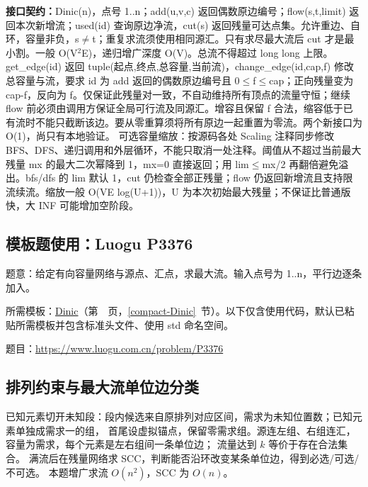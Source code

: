 {\sloppy{}\noindent\textbf{接口契约：}Dinic(n)，点号 1..n；add(u,v,c) 返回偶数原边编号；flow(s,t,limit) 返回本次新增流；used(id) 查询原边净流，cut(s) 返回残量可达点集。允许重边、自环，容量非负，s$\ne$t；重复求流须使用相同源汇。只有求尽最大流后 cut 才是最小割。一般 O(V$^{2}$E)，递归增广深度 O(V)。总流不得超过 long long 上限。 get\_edge(id) 返回 tuple(起点,终点,总容量,当前流)，change\_edge(id,cap,f) 修改总容量与流，要求 id 为 add 返回的偶数原边编号且 0$\le$f$\le$cap；正向残量变为 cap-f，反向为 f。仅保证此残量对一致，不自动维持所有顶点的流量守恒；继续 flow 前必须由调用方保证全局可行流及同源汇。增容且保留 f 合法，缩容低于已有流时不能只截断该边。要从零重算须将所有原边一起重置为零流。两个新接口为 O(1)，尚只有本地验证。 可选容量缩放：按源码各处 Scaling 注释同步修改 BFS、DFS、递归调用和外层循环，不能只取消一处注释。阈值从不超过当前最大残量 mx 的最大二次幂降到 1，mx=0 直接返回；用 lim$\le$mx/2 再翻倍避免溢出。bfs/dfs 的 lim 默认 1，cut 仍检查全部正残量；flow 仍返回新增流且支持限流续流。缩放一般 O(VE log(U+1))，U 为本次初始最大残量；不保证比普通版快，大 INF 可能增加空阶段。\par}

\Needspace{400pt}



\newpage



\newpage



\Needspace{329pt}

\subsection*{模板题使用：Luogu P3376}

\label{usage-example-1}

题意：给定有向容量网络与源点、汇点，求最大流。输入点号为 1..n，平行边逐条加入。

所需模板：\hyperref[compact-Dinic]{Dinic}（第~\pageref{compact-Dinic}~页，\ref{compact-Dinic}~节）。以下仅含使用代码，默认已粘贴所需模板并包含标准头文件、使用 std 命名空间。

题目：\url{https://www.luogu.com.cn/problem/P3376}



\subsection{排列约束与最大流单位边分类}\label{knowledge-flow-units}
已知元素切开未知段：段内候选来自原排列对应区间，需求为未知位置数；已知元素单独成需求一的组，
首尾设虚拟锚点，保留零需求组。源连左组、右组连汇，容量为需求，每个元素是左右组间一条单位边；
流量达到 $k$ 等价于存在合法集合。
满流后在残量网络求 SCC，判断能否沿环改变某条单位边，得到必选/可选/不可选。
本题增广求流 $O(n^2)$，SCC 为 $O(n)$。


